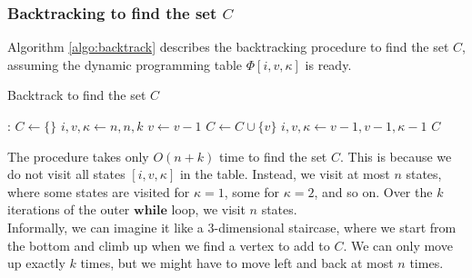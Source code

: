 \documentclass[9pt]{article}
\begin{document}
\subsubsection*{Backtracking  to find the set $C$}
Algorithm \ref{algo:backtrack} describes the backtracking procedure to find the set $C$,
assuming the dynamic programming table $\Phi[i, v, \kappa]$ is ready.
\begin{algorithm}[H]
    \caption{Backtrack to find the set $C$}
    \label{algo:backtrack}
    \begin{algorithmic}[1]
        :
            \State $C \gets \{ \}$
            \State $i, v, \kappa \gets n, n, k$
                \While{$\Phi[i, v, \kappa] = \Phi[i, v - 1, \kappa]$}
                    \State $v \gets v - 1$
                \EndWhile
                \State $C \gets C \cup \{ v \}$
                \State $i, v, \kappa \gets v-1, v-1, \kappa-1$
            \EndWhile
            \State \Return $C$
        \EndProcedure
    \end{algorithmic}
\end{algorithm}
\hspace*{-19pt}
The procedure takes only $O(n + k)$ time to find the set $C$. This is because we do not visit
all states $[i, v, \kappa]$ in the table. Instead, we visit at most $n$ states, where some
states are visited for $\kappa = 1$, some for $\kappa = 2$, and so on. Over the $k$
iterations of the outer $\textbf{while}$ loop, we visit $n$ states. \\
Informally, we can imagine it like a 3-dimensional staircase, where we start from the bottom
and climb up when we find a vertex to add to $C$. We can only move up exactly $k$ times, but
we might have to move left and back at most $n$ times.
\end{document}
